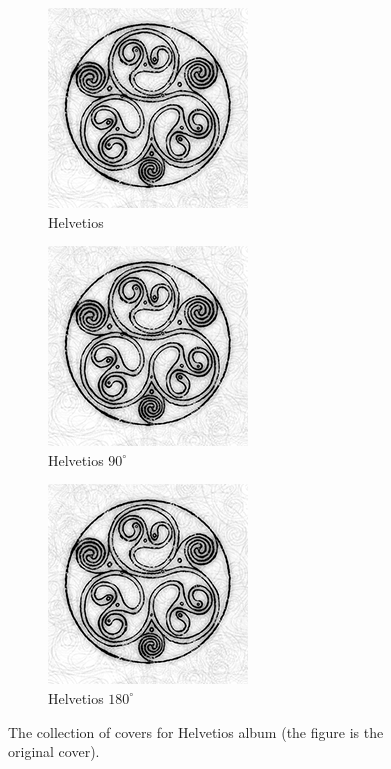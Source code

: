 \documentclass{article}
\begin{document}
\begin{figure}
	\centering
	
	\begin{subfigure}[b]{0.3\textwidth}
		\includegraphics[scale=0.5]{helvetios}
		\caption{Helvetios}
		\label{fig:helvetios}
	\end{subfigure}
	\begin{subfigure}[b]{0.3\textwidth}
		\includegraphics[scale=0.5,angle=90]{helvetios}
		\caption{Helvetios $90^{\circ}$}
	\end{subfigure}
	\begin{subfigure}[b]{0.3\textwidth}
		\includegraphics[scale=0.5,angle=180]{helvetios}
		\caption{Helvetios $180^{\circ}$}
	\end{subfigure}
	
	\caption{The collection of covers for Helvetios album (the figure  is the original cover).}
\end{figure}
\end{document}
